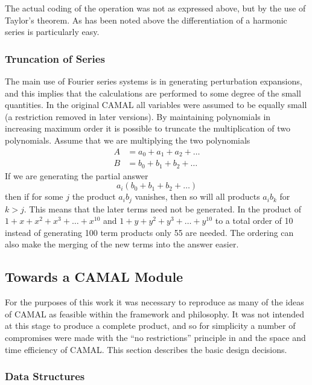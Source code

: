 The actual coding of the operation was not as expressed above, but by
the use of Taylor's theorem.  As has been noted above the
differentiation of a harmonic series is particularly easy.

\subsubsection{Truncation of Series}

The main use of Fourier series systems is in generating perturbation
expansions, and this implies that the calculations are performed to
some degree of the small quantities.  In the original CAMAL all
variables were assumed to be equally small (a restriction removed in
later versions).  By maintaining polynomials in increasing maximum
order it is possible to truncate the multiplication of two
polynomials.  Assume that we are multiplying the two polynomials
\begin{align*}
        A &= a_0 + a_1 + a_2 + \ldots \\
        B &= b_0 + b_1 + b_2 + \ldots
\end{align*}
If we are generating the partial answer
\[
        a_i (b_0 + b_1 + b_2 + \ldots)
\]
then if for some $j$ the product $a_i b_j$ vanishes, then so will all
products $a_i b_k$ for $k>j$.  This means that the later terms need
not be generated.  In the product of $1+x+x^2+x^3+\ldots+x^{10}$ and
$1+y+y^2+y^3+\ldots+y^{10}$ to a total order of 10 instead of generating
100 term products only 55 are needed.  The ordering can also make the
merging of the new terms into the answer easier.

\subsection{Towards a CAMAL Module}

For the purposes of this work it was necessary to reproduce as many of
the ideas of CAMAL as feasible within the \REDUCE framework and
philosophy.  It was not intended at this stage to produce a complete
product, and so for simplicity a number of compromises were made with
the ``no restrictions'' principle in \REDUCE and the space and time
efficiency of CAMAL.  This section describes the basic design
decisions.

\subsubsection{Data Structures}

